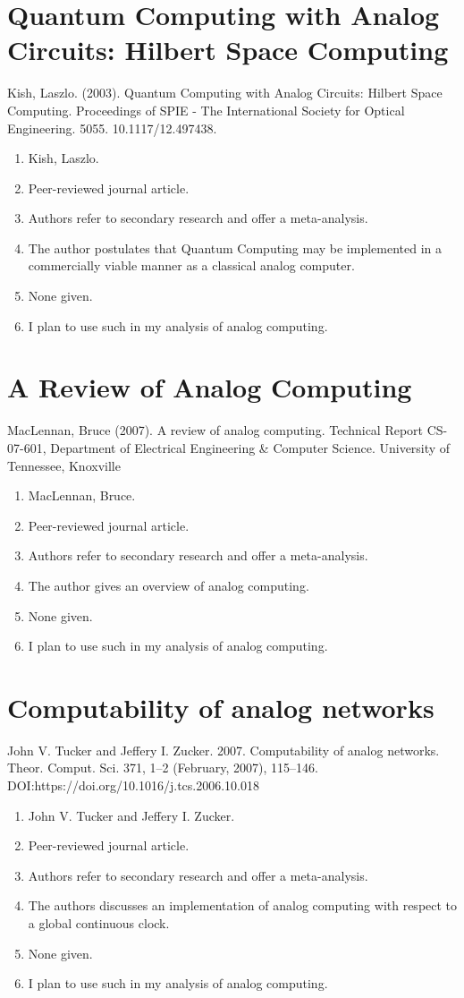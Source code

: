 \section*{Quantum Computing with Analog Circuits: Hilbert Space Computing}
Kish, Laszlo. (2003). Quantum Computing with Analog Circuits: Hilbert Space Computing. Proceedings of SPIE - The International Society for Optical Engineering. 5055. 10.1117/12.497438. 
\begin{enumerate}
    \item Kish, Laszlo.
    \item Peer-reviewed journal article.
    \item Authors refer to secondary research and offer a meta-analysis.
    \item The author postulates that Quantum Computing may be implemented in a commercially viable manner as a classical analog computer. 
    \item None given. 
    \item I plan to use such in my analysis of analog computing. 
\end{enumerate}

\section*{A Review of Analog Computing}
MacLennan, Bruce (2007). A review of analog computing. Technical Report CS-07-601, Department of Electrical Engineering \& Computer Science. University of Tennessee, Knoxville
\begin{enumerate}
    \item MacLennan, Bruce.
    \item Peer-reviewed journal article.
    \item Authors refer to secondary research and offer a meta-analysis.
    \item The author gives an overview of analog computing.
    \item None given. 
    \item I plan to use such in my analysis of analog computing. 
\end{enumerate}

\section*{Computability of analog networks}
John V. Tucker and Jeffery I. Zucker. 2007. Computability of analog networks. Theor. Comput. Sci. 371, 1–2 (February, 2007), 115–146. DOI:https://doi.org/10.1016/j.tcs.2006.10.018
\begin{enumerate}
    \item John V. Tucker and Jeffery I. Zucker.
    \item Peer-reviewed journal article.
    \item Authors refer to secondary research and offer a meta-analysis.
    \item The authors discusses an implementation of analog computing with respect to a global continuous clock.
    \item None given. 
    \item I plan to use such in my analysis of analog computing. 
\end{enumerate}

